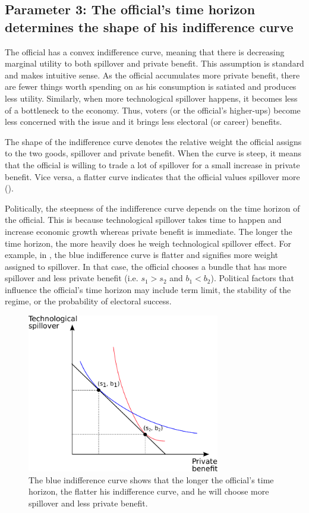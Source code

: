 \subsection{Parameter 3: The official's time horizon determines the shape of his indifference curve}

The official has a convex indifference curve, meaning that there is decreasing marginal utility to both spillover and private benefit. This assumption is standard and makes intuitive sense. As the official accumulates more private benefit, there are fewer things worth spending on as his consumption is satiated and produces less utility. Similarly, when more technological spillover happens, it becomes less of a bottleneck to the economy. Thus, voters (or the official's higher-ups) become less concerned with the issue and it brings less electoral (or career) benefits.

The shape of the indifference curve denotes the relative weight the official assigns to the two goods, spillover and private benefit. When the curve is steep, it means that the official is willing to trade a lot of spillover for a small increase in private benefit. Vice versa, a flatter curve indicates that the official values spillover more ().

Politically, the steepness of the indifference curve depends on the time horizon of the official. This is because technological spillover takes time to happen and increase economic growth whereas private benefit is immediate. The longer the time horizon, the more heavily does he weigh technological spillover effect. For example, in , the blue indifference curve is flatter and signifies more weight assigned to spillover. In that case, the official chooses a bundle that has more spillover and less private benefit (i.e. $s_1 > s_2$ and $b_1 < b_2$). Political factors that influence the official's time horizon may include term limit, the stability of the regime, or the probability of electoral success. 

\begin{figure}[!ht]
	\centering
    \includegraphics[width=0.75\textwidth, height=0.75\textheight,keepaspectratio]{../figure/indifference_curve}
    \caption{The blue indifference curve shows that the longer the official's time horizon, the flatter his indifference curve, and he will choose more spillover and less private benefit.}
    \label{fig:indifference_curve}
\end{figure}

